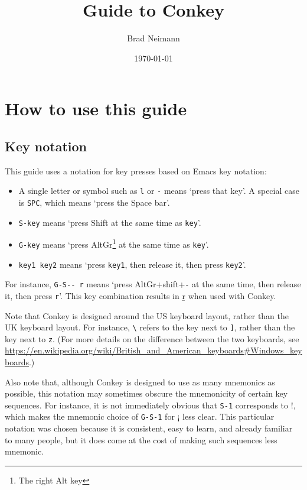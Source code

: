 \documentclass[oneside]{memoir}
\title{Guide to Conkey}
\author{Brad Neimann}
\date{\today}
\newcommand{\key}{\verb}
\newcommand{\out}[1]{\colorbox{gray!20}{#1}}
\begin{document}
\maketitle

\tableofcontents

\listoftables

\chapter{How to use this guide}
\label{sec:how_to_use}

\section{Key notation}
\label{sec:key_notation}

This guide uses a notation for key presses based on Emacs key notation:

\begin{itemize}
\item A single letter or symbol such as \key|l| or \key|-| means `press that key'. A special case is \key|SPC|, which means `press the Space bar'.
\item \key|S-key| means `press Shift at the same time as \key|key|'.
\item \key|G-key| means `press AltGr\footnote{The right Alt key} at the same time as \key|key|'.
\item \key|key1 key2| means `press \key|key1|, then release it, then press \key|key2|'.
\end{itemize}

For instance, \key|G-S-- r| means `press AltGr+shift+\key|-| at the same time, then release it, then press \key|r|'.
This key combination results in \out{ṟ} when used with Conkey.

Note that Conkey is designed around the US keyboard layout, rather than the UK keyboard layout.
For instance, \key|\| refers to the key next to \key|]|, rather than the key next to \key|z|.
(For more details on the difference between the two keyboards, see \url{https://en.wikipedia.org/wiki/British_and_American_keyboards#Windows_keyboards}.)

Also note that, although Conkey is designed to use as many mnemonics as possible,
  this notation may sometimes obscure the mnemonicity of certain key sequences.
For instance, it is not immediately obvious that \key|S-1| corresponds to \out{!},
  which makes the mnemonic choice of \key|G-S-1| for \out{¡} less clear.
This particular notation was chosen because it is consistent, easy to learn, and already familiar to many people,
  but it does come at the cost of making such sequences less mnemonic.
\end{document}
